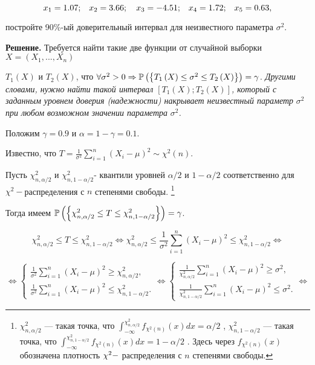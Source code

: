 \[x_{1} ={\rm 1.07;}\quad x_{2} ={\rm 3.66};\quad x_{3} =-{\rm 4.51;}\quad x_{4} ={\rm 1.72;}\quad x_{5} ={\rm 0.63,}\] 

постройте 90\%-ый доверительный интервал для неизвестного параметра $\sigma ^{2} $.

\textbf{Решение.} Требуется найти такие две функции от случайной выборки $X=\left(X_{1} ,...,X_{n} \right)$ 

$T_{1} \left(X\right)$ и $T_{2} \left(X\right)$, что $\forall \sigma ^{2} >0\Rightarrow {\rm {\mathbb P}}\left(\left\{T_{1} \left(X\right)\le \sigma ^{2} \le T_{2} \left(X\right)\right\}\right)=\gamma $. \textit{Другими словами, нужно найти такой интервал $\left[T_{1} \left(X\right);T_{2} \left(X\right)\right]$, который с заданным уровнем доверия (надежности) накрывает неизвестный параметр }$\sigma ^{2} $\textit{ при любом возможном значении параметра }$\sigma ^{2} $\textit{.}

Положим $\gamma =0.9$ и $\alpha =1-\gamma =0.1$.

Известно, что $T=\frac{1}{\sigma ^{2} } \sum _{i=1}^{n}\left(X_{i} -\mu \right)^{2}  \sim \chi ^{2} \left(n\right)$.

Пусть $\chi _{n,\alpha /2}^{2} $ и $\chi _{n,1-\alpha /2}^{2} $- квантили уровней $\alpha /2$ и $1-\alpha /2$ соответственно для $\chi ^{2} -$распределения с $n$ степенями свободы. \footnote{  $\chi _{n,\alpha /2}^{2} $  --- такая точка, что  $\int _{-\infty }^{\chi _{n,\alpha /2}^{2} }f_{\chi ^{2} \left(n\right)} \left(x\right)dx =\alpha /2$ ,  $\chi _{n,1-\alpha /2}^{2} $  --- такая точка, что  $\int _{-\infty }^{\chi _{n,1-\alpha /2}^{2} }f_{\chi ^{2} \left(n\right)} \left(x\right)dx =1-\alpha /2$ . Здесь через  $f_{\chi ^{2} \left(n\right)} \left(x\right)$  обозначена плотность  $\chi ^{2} {\rm -}$ распределения с  $n$  степенями свободы. }

Тогда имеем ${\rm {\mathbb P}}\left(\left\{\chi _{n,\alpha /2}^{2} \le T\le \chi _{n,1-\alpha /2}^{2} \right\}\right)=\gamma $.

\[\chi _{n,\alpha /2}^{2} \le T\le \chi _{n,1-\alpha /2}^{2} \Leftrightarrow \chi _{n,\alpha /2}^{2} \le \frac{1}{\sigma ^{2} } \sum _{i=1}^{n}\left(X_{i} -\mu \right)^{2}  \le \chi _{n,1-\alpha /2}^{2} \Leftrightarrow \] 

\[\Leftrightarrow \left\{\begin{array}{l} {\frac{1}{\sigma ^{2} } \sum _{i=1}^{n}\left(X_{i} -\mu \right)^{2}  \ge \chi _{n,\alpha /2}^{2} ,} \\ {\frac{1}{\sigma ^{2} } \sum _{i=1}^{n}\left(X_{i} -\mu \right)^{2}  \le \chi _{n,1-\alpha /2}^{2} .} \end{array}\right. \Leftrightarrow \left\{\begin{array}{l} {\frac{1}{\chi _{n,\alpha /2}^{2} } \sum _{i=1}^{n}\left(X_{i} -\mu \right)^{2}  \ge \sigma ^{2} ,} \\ {\frac{1}{\chi _{n,1-\alpha /2}^{2} } \sum _{i=1}^{n}\left(X_{i} -\mu \right)^{2}  \le \sigma ^{2} .} \end{array}\right. \Leftrightarrow \] 

